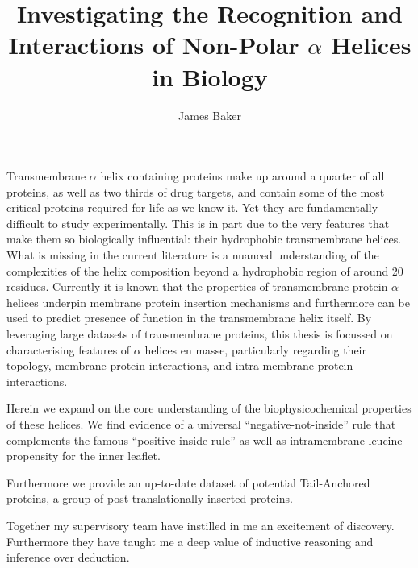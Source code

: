 \documentclass[12pt,PhD,twoside]{muthesis}
\begin{document}
\title{Investigating the Recognition and Interactions of Non-Polar $\alpha$ Helices in Biology}
\author{James Baker}
\def\wordcount{xxxxx}

\tablespagefalse

\figurespagefalse


\beforeabstract

Transmembrane $\alpha$ helix containing proteins make up around a quarter of all proteins, as well as two thirds of drug targets, and contain some of the most critical proteins required for life as we know it. Yet they are fundamentally difficult to study experimentally. This is in part due to the very features that make them so biologically influential: their hydrophobic transmembrane helices. What is missing in the current literature is a nuanced understanding of the complexities of the helix composition beyond a hydrophobic region of around 20 residues. Currently it is known that the properties of transmembrane protein $\alpha$ helices underpin membrane protein insertion mechanisms and furthermore can be used to predict presence of function in the transmembrane helix itself. By leveraging large datasets of transmembrane proteins, this thesis is focussed on characterising features of $\alpha$ helices en masse, particularly regarding their topology, membrane-protein interactions, and intra-membrane protein interactions.

Herein we expand on the core understanding of the biophysicochemical properties of these helices. We find evidence of a universal ``negative-not-inside'' rule that complements the famous ``positive-inside rule'' as well as intramembrane leucine propensity for the inner leaflet.

Furthermore we provide an up-to-date dataset of potential Tail-Anchored proteins, a group of post-translationally inserted proteins.

\afterabstract


Together my supervisory team have instilled in me an excitement of discovery. Furthermore they have taught me a deep value of inductive reasoning and inference over deduction.
\end{document}
